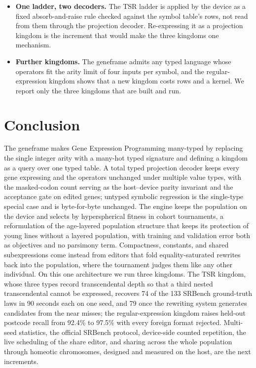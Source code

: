 \documentclass[sigconf,nonacm]{acmart}
\begin{document}
\begin{itemize}
with typing off that would answer this has not been run. A second, later
ceiling on the stream order of a tree (the Horton--Strahler number) was
measured as a hard rule on 83 problems and lost, 84.69\% against 85.61\% of
trials, with whole Lorentz and Gaussian laws among the losses; it is off in
every run reported here and survives only as a ranking column.
\item \textbf{One ladder, two decoders.} The TSR ladder is applied by the
device as a fixed absorb-and-raise rule checked against the symbol table's rows,
not read from them through the projection decoder. Re-expressing it as a
projection kingdom is the increment that would make the three kingdoms one
mechanism.
\item \textbf{Further kingdoms.} The geneframe admits any typed language whose
operators fit the arity limit of four inputs per symbol, and the regular-expression kingdom shows that a
new kingdom costs rows and a kernel. We report only the three kingdoms that are
built and run.
\end{itemize}

\section{Conclusion}
\label{sec:conclusion}

The geneframe makes Gene Expression Programming many-typed by replacing the
single integer arity with a many-hot typed signature and defining a kingdom as a
query over one typed table. A total typed projection decoder keeps every gene
expressing and the operators unchanged under multiple value types, with the
masked-codon count serving as the host--device parity invariant and the
acceptance gate on edited genes; untyped symbolic regression is the single-type
special case and is byte-for-byte unchanged. The engine keeps the population on the
device and selects by hyperspherical fitness in cohort tournaments, a
reformulation of the age-layered population structure that keeps its protection
of young lines without a layered population, with training and validation error
both as objectives and no parsimony term. Compactness, constants, and shared
subexpressions come instead from editors that fold equality-saturated rewrites
back into the population, where the tournament judges them like any other
individual. On this one architecture we run three kingdoms. The TSR kingdom,
whose three types record transcendental depth so that a third nested
transcendental cannot be expressed, recovers 74 of the 133 SRBench ground-truth
laws in 90 seconds each on one seed, and 79 once the rewriting system generates
candidates from the near misses; the regular-expression kingdom raises held-out
postcode recall from
92.4\% to 97.5\% with every foreign format rejected. Multi-seed statistics, the
official SRBench protocol, device-side counted repetition, the live
scheduling of the share editor, and sharing across the whole population through
homeotic chromosomes, designed and measured on the host, are the next
increments.
\end{document}
